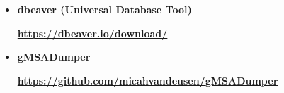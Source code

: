 \begin{itemize}
  
\item \textbf{dbeaver (Universal Database Tool)}

    \par 
      \href{https://dbeaver.io/download/}{\textbf{\color{blue}https://dbeaver.io/download/}}
    
\item \textbf{gMSADumper}

    \par 
      \href{https://github.com/micahvandeusen/gMSADumper}{\textbf{\color{blue}https://github.com/micahvandeusen/gMSADumper}}
    
  
\end{itemize}
